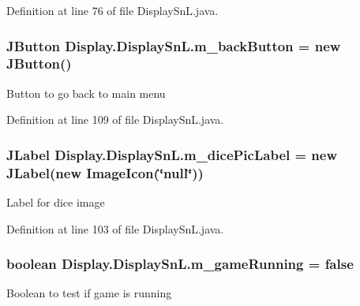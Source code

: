 Definition at line 76 of file Display\+Sn\+L.\+java.

\hypertarget{class_display_1_1_display_sn_l_a9452f0a663eaea507cf3561851e5c74e}{}
\subsubsection[{m\+\_\+back\+Button}]{\setlength{\rightskip}{0pt plus 5cm}J\+Button Display.\+Display\+Sn\+L.\+m\+\_\+back\+Button = new J\+Button()\hspace{0.3cm}{\ttfamily [private]}}\label{class_display_1_1_display_sn_l_a9452f0a663eaea507cf3561851e5c74e}
Button to go back to main menu 

Definition at line 109 of file Display\+Sn\+L.\+java.

\hypertarget{class_display_1_1_display_sn_l_aafb6d505956de58bbd229a789342ef19}{}
\subsubsection[{m\+\_\+dice\+Pic\+Label}]{\setlength{\rightskip}{0pt plus 5cm}J\+Label Display.\+Display\+Sn\+L.\+m\+\_\+dice\+Pic\+Label = new J\+Label(new Image\+Icon(\char`\"{}null\char`\"{}))\hspace{0.3cm}{\ttfamily [private]}}\label{class_display_1_1_display_sn_l_aafb6d505956de58bbd229a789342ef19}
Label for dice image 

Definition at line 103 of file Display\+Sn\+L.\+java.

\hypertarget{class_display_1_1_display_sn_l_a45db4653b01756f831e54afb47f9010b}{}
\subsubsection[{m\+\_\+game\+Running}]{\setlength{\rightskip}{0pt plus 5cm}boolean Display.\+Display\+Sn\+L.\+m\+\_\+game\+Running = false\hspace{0.3cm}{\ttfamily [private]}}\label{class_display_1_1_display_sn_l_a45db4653b01756f831e54afb47f9010b}
Boolean to test if game is running 

